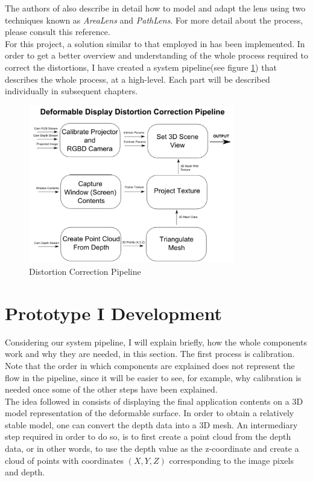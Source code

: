 \documentclass[]{article}
\begin{document}
The authors of \cite{pindat12} also describe in detail how to model and adapt the lens using two techniques known as \textit{AreaLens} and \textit{PathLens}. For more detail about the process, please consult this reference.\\

For this project, a solution similar to that employed in \cite{watanabe08} has been implemented. In order to get a better overview and understanding of the whole process required to correct the distortions, I have created a system pipeline(see figure \ref{fig:Pipeline}) that describes the whole process, at a high-level. Each part will be described individually in subsequent chapters.

\begin{figure}[hbtp]
    \centering
    \includegraphics[width=0.8\textwidth]{figures/DeformableDisplayPipeline.PNG}
    \caption{Distortion Correction Pipeline}
    \label{fig:Pipeline}
\end{figure}

\section{Prototype I Development}

Considering our system pipeline, I will explain briefly, how the whole components work and why they are needed, in this section. The first process is calibration. Note that the order in which components are explained does not represent the flow in the pipeline, since it will be easier to see, for example, why calibration is needed once some of the other steps have been explained.\\

The idea followed in \cite{watanabe08} consists of displaying the final application contents on a 3D model representation of the deformable surface. In order to obtain a relatively stable model, one can convert the depth data into a 3D mesh. An intermediary step required in order to do so, is to first create a point cloud from the depth data, or in other words, to use the depth value as the z-coordinate and create a cloud of points with coordinates $(X, Y, Z)$ corresponding to the image pixels and depth.\\
\end{document}
